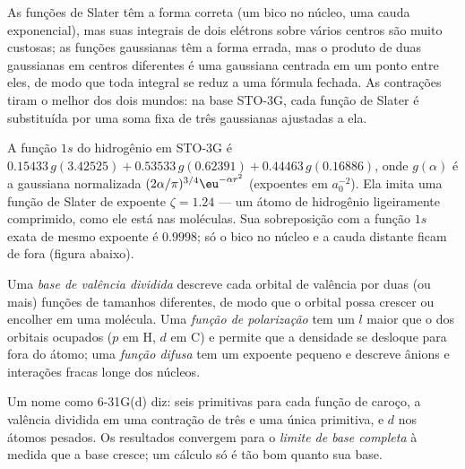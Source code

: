 As funções de Slater têm a forma correta (um bico no núcleo, uma cauda
exponencial), mas suas integrais de dois elétrons sobre vários centros são
muito custosas; as funções gaussianas têm a forma errada, mas o produto de
duas gaussianas em centros diferentes é uma gaussiana centrada em um ponto
entre eles, de modo que toda integral se reduz a uma fórmula fechada. As
contrações tiram o melhor dos dois mundos: na base STO-3G, cada função de
Slater é substituída por uma soma fixa de três gaussianas ajustadas a ela.

\begin{example}\label{ex:b3:computational-chemistry:sto3g}
A função $1s$ do hidrogênio em STO-3G é $0.15433\,g(3.42525) + 0.53533\,
g(0.62391) + 0.44463\,g(0.16886)$, onde $g(\alpha)$ é a gaussiana normalizada
$(2\alpha/\pi)^{3/4}\eu^{-\alpha r^2}$ (expoentes em $a_0^{-2}$). Ela imita uma
função de Slater de expoente $\zeta = 1.24$ --- um átomo de hidrogênio
ligeiramente comprimido, como ele está nas moléculas. Sua sobreposição com a
função $1s$ exata de mesmo expoente é $0.9998$; só o bico no núcleo e a cauda
distante ficam de fora (figura abaixo).
\end{example}

\begin{definition}\label{def:b3:computational-chemistry:split-valence}
Uma \emph{base de valência dividida} descreve cada
orbital de valência por duas (ou mais) funções de tamanhos diferentes, de
modo que o orbital possa crescer ou encolher em uma molécula. Uma \emph{função de
polarização} tem um $l$ maior que o dos orbitais
ocupados ($p$ em H, $d$ em C) e permite que a densidade se desloque para fora do átomo; uma
\emph{função difusa} tem um expoente pequeno e
descreve ânions e interações fracas longe dos núcleos.
\end{definition}

Um nome como 6-31G(d) diz: seis primitivas para cada função de caroço, a
valência dividida em uma contração de três e uma única primitiva, e  $d$ nos átomos pesados. Os resultados convergem para o
\emph{limite de base completa} à medida que a base cresce; um cálculo só é
tão bom quanto sua base.

